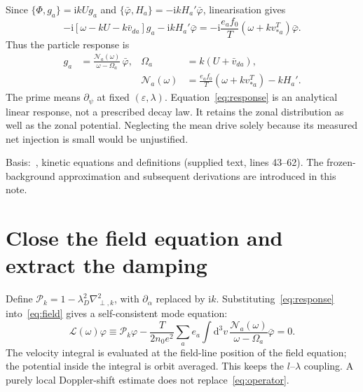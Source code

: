 \documentclass[10pt,a4paper]{article}
\newcommand{\dd}{\mathrm{d}}
\newcommand{\ii}{\mathrm{i}}
\newcommand{\N}{\mathcal{N}}
\newcommand{\Op}{\mathcal{L}}
\newcommand{\varphibar}{\bar\varphi}
\newcommand{\vd}{\bar v_{da}}
\begin{document}
Since $\{\Phi,g_a\}=\ii kUg_a$ and $\{\varphibar,H_a\}=-\ii kH_a'\varphibar$, linearisation gives
\begin{equation}
 -\ii[\omega-kU-k\vd]g_a-\ii kH_a'\varphibar
 =-\ii\frac{e_af_0}{T}(\omega+kv_{*a}^{T})\varphibar.
 \label{eq:linear}
\end{equation}
Thus the particle response is
\begin{equation}
 \boxed{\begin{aligned}
 g_a&=\frac{\N_a(\omega)}{\omega-\Omega_a}\,\varphibar,
 &\Omega_a&=k(U+\vd),\\[-1pt]
 &&\N_a(\omega)&=\frac{e_af_0}{T}(\omega+kv_{*a}^{T})-kH_a'.
 \end{aligned}}\label{eq:response}
\end{equation}
The prime means $\partial_\psi$ at fixed $(\varepsilon,\lambda)$. Equation~\eqref{eq:response} is an analytical linear response, not a prescribed decay law. It retains the zonal distribution as well as the zonal potential. Neglecting the mean drive solely because its measured net injection is small would be unjustified.

{\small\color{muted}Basis:~\cite{draft}, kinetic equations and definitions (supplied text, lines 43--62). The frozen-background approximation and subsequent derivations are introduced in this note.\par}

\newpage
\section{Close the field equation and extract the damping}
Define $\mathcal P_k=1-\lambda_D^2\nabla_{\perp,k}^2$, with $\partial_\alpha$ replaced by $\ii k$.
Substituting~\eqref{eq:response} into~\eqref{eq:field} gives a self-consistent mode equation:
\begin{equation}
 \Op(\omega)\varphi\equiv\mathcal P_k\varphi
 -\frac{T}{2n_0e^2}\sum_a e_a\int\dd^3v\,
 \frac{\N_a(\omega)}{\omega-\Omega_a}\varphibar=0.
 \label{eq:operator}
\end{equation}
The velocity integral is evaluated at the field-line position of the field equation; the potential inside the integral is orbit averaged. This keeps the $l$--$\lambda$ coupling. A purely local Doppler-shift estimate does not replace~\eqref{eq:operator}.
\end{document}
